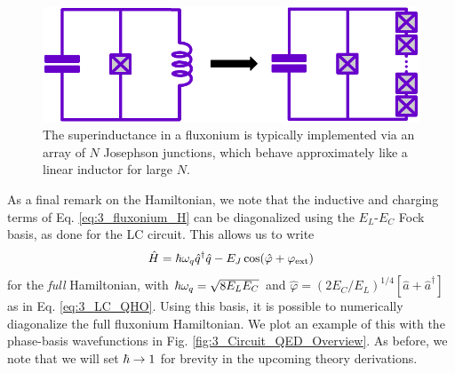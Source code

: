 \begin{figure}
    \centering
    \includegraphics[width=0.7\linewidth]{Figures/3/Superinductance.pdf}
    \caption[Superinductance in a fluxonium qubit comprised of an array of Josephson junctions.]{The superinductance in a fluxonium is typically implemented via an array of $N$ Josephson junctions, which behave approximately like a linear inductor for large $N$.}
    \label{fig:3_Superinductance}
\end{figure}

As a final remark on the Hamiltonian, we note that the inductive and charging terms of Eq. \eqref{eq:3_fluxonium_H} can be diagonalized using the $E_L$-$E_C$ Fock basis, as done for the LC circuit. This allows us to write
\begin{equation}
    \hat{H} = \hbar\omega_q\hat{q}^\dagger\hat{q} - E_J\cos(\hat{\varphi} + \varphi_{\rm ext})
\end{equation}
for the \textit{full} Hamiltonian, with $\hbar\omega_q = \sqrt{8 E_LE_C}$ and $\hat{\varphi} = (2E_C/E_L)^{1/4}[\hat{a} + \hat{a}^\dagger]$ as in Eq. \eqref{eq:3_LC_QHO}. Using this basis, it is possible to numerically diagonalize the full fluxonium Hamiltonian. We plot an example of this with the phase-basis wavefunctions in Fig. \ref{fig:3_Circuit_QED_Overview}. As before, we note that we will set $\hbar \to 1$ for brevity in the upcoming theory derivations. 

